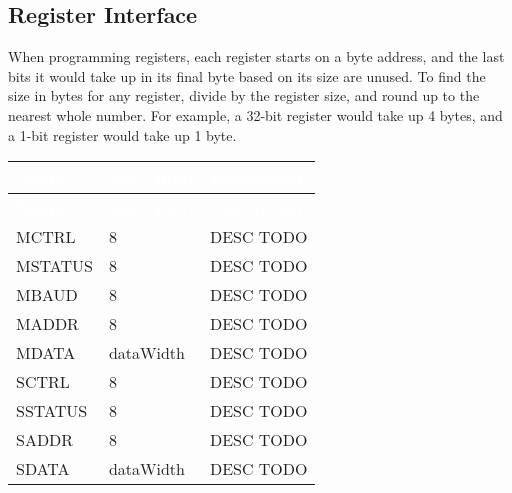 \subsection{Register Interface}
 
When programming registers, each register starts on a byte address, and the last bits it would take up in its final byte based on its size are unused. To find the size in bytes for any register, divide by the register size, and round up to the nearest whole number. For example, a 32-bit register would take up 4 bytes, and a 1-bit register would take up 1 byte.
\renewcommand*{\arraystretch}{1.4}
\begingroup
\small
{} %
\begin{longtable}[H]{
  | p{}
  | p{}
  | p{} |
  }
  \hline
  \rowcolor{gray}

  \textcolor{white}{\textbf{Name}} &   
  \textcolor{white}{\textbf{Size (Bits)}} &   
  \textcolor{white}{\textbf{Description}} \\ \hline \hline
  \endfirsthead

  \textcolor{white}{\textbf{Name}} &   
  \textcolor{white}{\textbf{Size (Bits)}} &   
  \textcolor{white}{\textbf{Description}} \\ \hline \hline
  \endhead

  
  MCTRL  &   
  8 &   
  DESC TODO \\ \hline

  MSTATUS &   
  8 &   
  DESC TODO \\ \hline

  MBAUD &   
  8 &   
  DESC TODO \\ \hline

  MADDR &   
  8 &   
  DESC TODO \\ \hline

  MDATA &   
  dataWidth &   
  DESC TODO \\ \hline

  SCTRL  &   
  8 &   
  DESC TODO \\ \hline

  SSTATUS &   
  8 &   
  DESC TODO \\ \hline

  SADDR &   
  8 &   
  DESC TODO \\ \hline

  SDATA &   
  dataWidth &   
  DESC TODO \\ \hline

\end{longtable}
\captionsetup{aboveskip=0pt}
\label{table:register}

